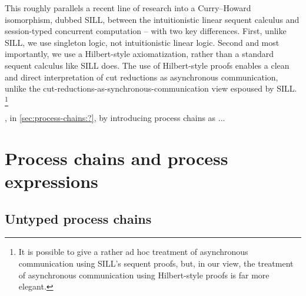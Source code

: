 This roughly parallels a recent line of research into a Curry--Howard isomorphism, dubbed SILL, between the intuitionistic linear sequent calculus and session-typed concurrent computation\autocites{Caires+:MSCS13}{Caires+:TLDI12} -- with two key differences.
First, unlike SILL, we use singleton logic, not intuitionistic linear logic.
Second and most importantly, we use a Hilbert-style axiomatization, rather than a standard sequent calculus like SILL does.
The use of Hilbert-style proofs enables a clean and direct interpretation of cut reductions as asynchronous communication, unlike the cut-reductions-as-synchronous-communication view espoused by SILL.%
\footnote{It is possible to give a rather ad hoc treatment of asynchronous communication using SILL's sequent proofs\textcite{DeYoung+:CSL12}, but, in our view, the treatment of asynchronous communication using Hilbert-style proofs is far more elegant.}







, in \cref{sec:process-chains:?}, by introducing process chains as ...


\section{Process chains and process expressions}

\subsection{Untyped process chains}

